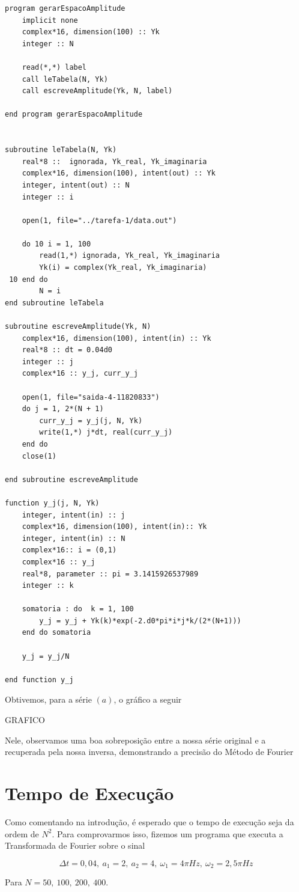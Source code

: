 \documentclass[11pt]{article}
\begin{document}
\begin{verbatim}
program gerarEspacoAmplitude
    implicit none
    complex*16, dimension(100) :: Yk
    integer :: N

    read(*,*) label
    call leTabela(N, Yk)
    call escreveAmplitude(Yk, N, label)

end program gerarEspacoAmplitude


subroutine leTabela(N, Yk)
    real*8 ::  ignorada, Yk_real, Yk_imaginaria
    complex*16, dimension(100), intent(out) :: Yk
    integer, intent(out) :: N
    integer :: i

    open(1, file="../tarefa-1/data.out")

    do 10 i = 1, 100
        read(1,*) ignorada, Yk_real, Yk_imaginaria
        Yk(i) = complex(Yk_real, Yk_imaginaria)
 10 end do
        N = i
end subroutine leTabela

subroutine escreveAmplitude(Yk, N)
    complex*16, dimension(100), intent(in) :: Yk
    real*8 :: dt = 0.04d0
    integer :: j
    complex*16 :: y_j, curr_y_j

    open(1, file="saida-4-11820833")
    do j = 1, 2*(N + 1)
        curr_y_j = y_j(j, N, Yk)
        write(1,*) j*dt, real(curr_y_j)
    end do
    close(1)

end subroutine escreveAmplitude

function y_j(j, N, Yk)
    integer, intent(in) :: j
    complex*16, dimension(100), intent(in):: Yk
    integer, intent(in) :: N
    complex*16:: i = (0,1)
    complex*16 :: y_j
    real*8, parameter :: pi = 3.1415926537989
    integer :: k

    somatoria : do  k = 1, 100
        y_j = y_j + Yk(k)*exp(-2.d0*pi*i*j*k/(2*(N+1)))
    end do somatoria

    y_j = y_j/N

end function y_j
\end{verbatim}

Obtivemos, para a série \((a)\), o gráfico a seguir

GRAFICO

Nele, observamos uma boa sobreposição entre a nossa série original e a recuperada pela nossa inversa, demonstrando a precisão do Método de Fourier

\section*{Tempo de Execução}
\label{sec:org675428c}

Como comentando na introdução, é esperado que o tempo de execução seja da ordem de \(N^2\). 
Para comprovarmos isso, fizemos um programa que executa a Transformada de Fourier sobre o sinal
\begin{latex}
\begin{equation}
\label{eq: sinais usado pros testes}
\Delta t = 0,04,\ a_1 = 2,\ a_2 = 4,\ \omega_1 = 4\pi Hz,\ \omega_2 = 2,5\pi Hz
\end{equation}
\end{latex}
Para \(N = 50,\ 100,\ 200,\ 400\).
\end{document}
